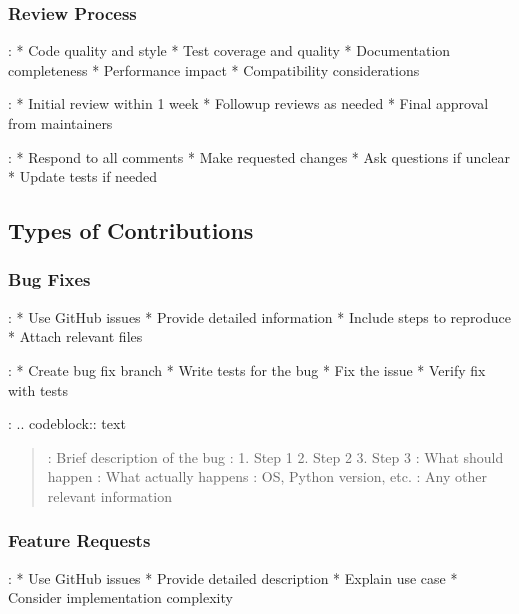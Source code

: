 \documentclass[a4paper,10pt,english,openany,oneside]{sphinxmanual}
\begin{document}
\subsubsection{Review Process}
\label{\detokenize{contributing:review-process}}
\sphinxAtStartPar
{}:
* Code quality and style
* Test coverage and quality
* Documentation completeness
* Performance impact
* Compatibility considerations

\sphinxAtStartPar
{}:
* Initial review within 1 week
* Follow\sphinxhyphen{}up reviews as needed
* Final approval from maintainers

\sphinxAtStartPar
{}:
* Respond to all comments
* Make requested changes
* Ask questions if unclear
* Update tests if needed


\subsection{Types of Contributions}
\label{\detokenize{contributing:types-of-contributions}}

\subsubsection{Bug Fixes}
\label{\detokenize{contributing:bug-fixes}}
\sphinxAtStartPar
{}:
* Use GitHub issues
* Provide detailed information
* Include steps to reproduce
* Attach relevant files

\sphinxAtStartPar
{}:
* Create bug fix branch
* Write tests for the bug
* Fix the issue
* Verify fix with tests

\sphinxAtStartPar
{}:
.. code\sphinxhyphen{}block:: text
\begin{quote}

\sphinxAtStartPar
{}: Brief description of the bug
:
1. Step 1
2. Step 2
3. Step 3
: What should happen
: What actually happens
: OS, Python version, etc.
: Any other relevant information
\end{quote}


\subsubsection{Feature Requests}
\label{\detokenize{contributing:feature-requests}}
\sphinxAtStartPar
{}:
* Use GitHub issues
* Provide detailed description
* Explain use case
* Consider implementation complexity
\end{document}
